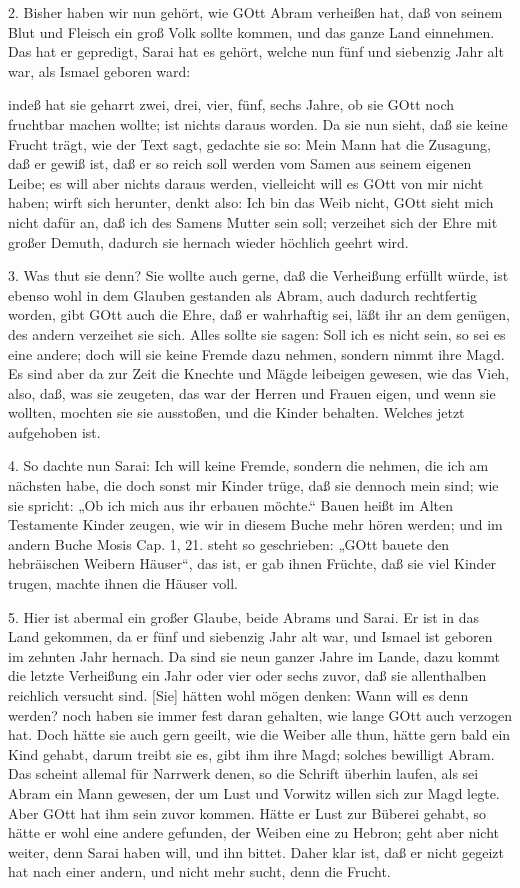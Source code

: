 2. Bisher haben wir nun gehört, wie GOtt Abram verheißen hat, daß von seinem Blut und Fleisch ein groß Volk sollte kommen, und das ganze Land einnehmen. Das hat er gepredigt, Sarai hat es gehört, welche nun fünf und siebenzig Jahr alt war, als Ismael geboren ward:


indeß hat sie geharrt zwei, drei, vier, fünf, sechs Jahre, ob sie GOtt noch fruchtbar machen wollte; ist nichts daraus worden. Da sie nun sieht, daß sie keine Frucht trägt, wie der Text sagt, gedachte sie so: Mein Mann hat die Zusagung, daß er gewiß ist, daß er so reich soll werden vom Samen aus seinem eigenen Leibe; es will aber nichts daraus werden, vielleicht will es GOtt von mir nicht haben; wirft sich herunter, denkt also: Ich bin das Weib nicht, GOtt sieht mich nicht dafür an, daß ich des Samens Mutter sein soll; verzeihet sich der Ehre mit großer Demuth, dadurch sie hernach wieder höchlich geehrt wird.

3. Was thut sie denn? Sie wollte auch gerne, daß die Verheißung erfüllt würde, ist ebenso wohl in dem Glauben gestanden als Abram, auch dadurch rechtfertig worden, gibt GOtt auch die Ehre, daß er wahrhaftig sei, läßt ihr an dem genügen, des andern verzeihet sie sich. Alles sollte sie sagen: Soll ich es nicht sein, so sei es eine andere; doch will sie keine Fremde dazu nehmen, sondern nimmt ihre Magd. Es sind aber da zur Zeit die Knechte und Mägde leibeigen gewesen, wie das Vieh, also, daß, was sie zeugeten, das war der Herren und Frauen eigen, und wenn sie wollten, mochten sie sie ausstoßen, und die Kinder behalten. Welches jetzt aufgehoben ist.

4. So dachte nun Sarai: Ich will keine Fremde, sondern die nehmen, die ich am nächsten habe, die doch sonst mir Kinder trüge, daß sie dennoch mein sind; wie sie spricht: „Ob ich mich aus ihr erbauen möchte.“ Bauen heißt im Alten Testamente Kinder zeugen, wie wir in diesem Buche mehr hören werden; und im andern Buche Mosis Cap. 1, 21. steht so geschrieben: „GOtt bauete den hebräischen Weibern Häuser“, das ist, er gab ihnen Früchte, daß sie viel Kinder trugen, machte ihnen die Häuser voll.

5. Hier ist abermal ein großer Glaube, beide Abrams und Sarai. Er ist in das Land gekommen, da er fünf und siebenzig Jahr alt war, und Ismael ist geboren im zehnten Jahr hernach. Da sind sie neun ganzer Jahre im Lande, dazu kommt die letzte Verheißung ein Jahr oder vier oder sechs zuvor, daß sie allenthalben reichlich versucht sind. [Sie] hätten wohl mögen denken: Wann will es denn werden? noch haben sie immer fest daran gehalten, wie lange GOtt auch verzogen hat. Doch hätte sie auch gern geeilt, wie die Weiber alle thun, hätte gern bald ein Kind gehabt, darum treibt sie es, gibt ihm ihre Magd; solches bewilligt Abram. Das scheint allemal für Narrwerk denen, so die Schrift überhin laufen, als sei Abram ein Mann gewesen, der um Lust und Vorwitz willen sich zur Magd legte. Aber GOtt hat ihm sein zuvor kommen. Hätte er Lust zur Büberei gehabt, so hätte er wohl eine andere gefunden, der Weiben eine zu Hebron; geht aber nicht weiter, denn Sarai haben will, und ihn bittet. Daher klar ist, daß er nicht gegeizt hat nach einer andern, und nicht mehr sucht, denn die Frucht.

